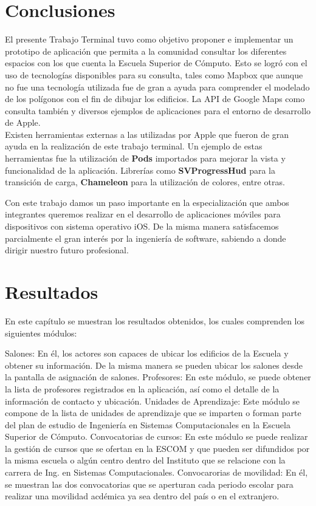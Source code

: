 \section{Conclusiones}

El presente Trabajo Terminal tuvo como objetivo proponer e implementar un prototipo de aplicación que permita a la comunidad consultar los diferentes espacios con los que cuenta la Escuela Superior de Cómputo. Esto se logró con el uso de tecnologías disponibles para su consulta, tales como Mapbox que aunque no fue una tecnología utilizada fue de gran a ayuda para comprender el modelado de los polígonos con el fin de dibujar los edificios. La API de Google Maps como consulta también y diversos ejemplos de aplicaciones para el entorno de desarrollo de Apple.\\

Existen herramientas externas a las utilizadas por Apple que fueron de gran ayuda en la realización de este trabajo terminal. Un ejemplo de estas herramientas fue la utilización de \textbf{Pods} importados para mejorar la vista y funcionalidad de la aplicación. Librerías como \textbf{SVProgressHud} para la transición de carga, \textbf{Chameleon} para la utilización de colores, entre otras.

Con este trabajo damos un paso importante en la especialización que ambos integrantes queremos realizar en el desarrollo de aplicaciones móviles para dispositivos con sistema operativo iOS. De la misma manera satisfacemos parcialmente el gran interés por la ingeniería de software, sabiendo a donde dirigir nuestro futuro profesional.

\section{Resultados}

En este capítulo se muestran los resultados obtenidos, los cuales comprenden los siguientes módulos:\\

\begin{UClist} 
	\UCli Salones: En él, los actores son capaces de ubicar los edificios de la Escuela y obtener su información. De la misma manera se pueden ubicar los salones desde la pantalla de asignación de salones.
	\UCli Profesores: En este módulo, se puede obtener la lista de profesores registrados en la aplicación, así como el detalle de la información de contacto y ubicación.
	\UCli Unidades de Aprendizaje: Este módulo se compone de la lista de unidades de aprendizaje que se imparten o forman parte del plan de estudio de Ingeniería en Sistemas Computacionales en la Escuela Superior de Cómputo.
	\UCli Convocatorias de cursos: En este módulo se puede realizar la gestión de cursos que se ofertan en la ESCOM y que pueden ser difundidos por la misma escuela o algún centro dentro del Instituto que se relacione con la carrera de Ing. en Sistemas Computacionales.
	\UCli Convocarorias de movilidad:  En él, se muestran las dos convocatorias que se aperturan cada periodo escolar para realizar una movilidad acdémica ya sea dentro del país o en el extranjero.
\end{UClist} 

